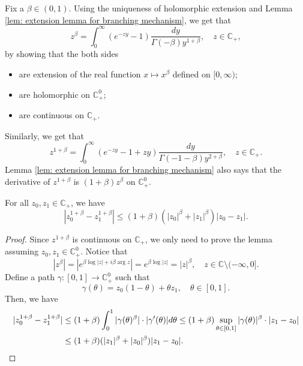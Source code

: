     Fix a $\beta \in (0,1)$.
    Using the uniqueness of holomorphic extension and Lemma \ref{lem: extension lemma for branching mechanism}, we get that
\begin{equation}
    z^{\beta}
    = \int_0^\infty (e^{-zy}-1) \frac{dy}{\Gamma(-\beta)y^{1+\beta}},
    \quad z\in \mathbb C_+,
\end{equation}
    by showing that the both sides
\begin{itemize}
\item
    are extension of the real function $x\mapsto x^{\beta}$ defined on $[0,\infty)$;
\item
    are holomorphic on $\mathbb C_+^0$;
\item
    are continuous on $\mathbb C_+$.
\end{itemize}
    Similarly, we get that
\begin{equation}
\label{eq: stable branching on C+}
    z^{1+\beta}
    = \int_0^\infty (e^{-zy}-1+zy)\frac{dy}{\Gamma(-1-\beta)y^{2+\beta}},
    \quad z\in \mathbb C_+.
\end{equation}
    Lemma \ref{lem: extension lemma for branching mechanism} also says that the derivative of $z^{1+\beta}$ is $(1+\beta)z^{\beta}$ on $\mathbb C^0_+$.
\begin{lem}
\label{lem: Lip of power function}
    For all $z_0,z_1 \in \mathbb C_+$, we have
\begin{equation}
\label{eq: Lip of power function}
    |z_0^{1+\beta} - z_1^{1+\beta}|
    \leq (1+\beta)(|z_0|^{\beta}+|z_1|^{\beta})|z_0 - z_1|.
\end{equation}

\end{lem}
\begin{proof}
    Since $z^{1+\beta}$ is continuous on $\mathbb C_+$, we only need to prove the lemma assuming $z_0,z_1 \in \mathbb C^0_+$.
    Notice that
\begin{equation}
\label{eq: upper bound for beta power of z}
    |z^\beta|
    = |e^{\beta \log |z| +i\beta \operatorname {arg}z}| = e^{\beta \log |z|} = |z|^\beta,
    \quad z \in \mathbb C\setminus (-\infty, 0].
\end{equation}
    Define a path $\gamma: [0,1] \to \mathbb C^0_+$ such that
\[
    \gamma(\theta)
    = z_0 (1-\theta) + \theta z_1,
    \quad \theta \in [0,1].
\]
    Then, we have
\begin{align}
    |z_0^{1+\beta} - z_1^{1+\beta}|
    &\leq (1+\beta) \int_0^1 |\gamma(\theta)^{\beta}|\cdot |\gamma'(\theta)|d\theta
    \leq (1+\beta)  \sup_{\theta \in [0,1]} |\gamma(\theta)|^{\beta} \cdot |z_1-z_0|
    \\&\leq (1+\beta)  ( |z_1|^{\beta}+|z_0|^{\beta} ) |z_1-z_0|.
    \qedhere
\end{align}
\end{proof}


